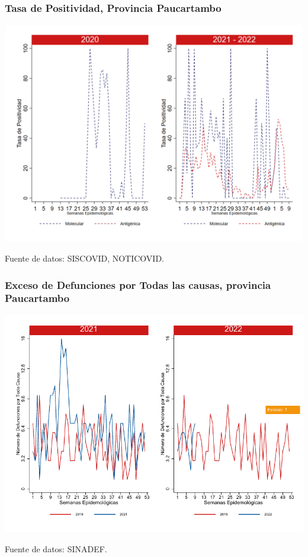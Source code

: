 \documentclass[xcolor=table]{beamer}
\begin{document}
\begin{frame}
	\frametitle{Tasa de Positividad, Provincia Paucartambo}
	\vspace{-.5cm}
	\begin{center}
		\includegraphics[width=0.8\linewidth, trim={0cm .5cm 0cm 0.2cm},clip]{../figuras/positividad_20_21_11.png}
	\end{center}
	{\tiny Fuente de datos: SISCOVID, NOTICOVID.}
\end{frame}

\begin{frame}
	\frametitle{Exceso de Defunciones por Todas las causas, provincia Paucartambo}
	\vspace{-.5cm}
	\begin{center}
		\includegraphics[width=0.8\linewidth, trim={0cm .5cm 0cm 0.2cm},clip]{../figuras/exceso_11.pdf}
	\end{center}
	{\tiny Fuente de datos: SINADEF.}
	
	\hyperlink{indicadores_provinciales}{}
\end{frame}
\end{document}
